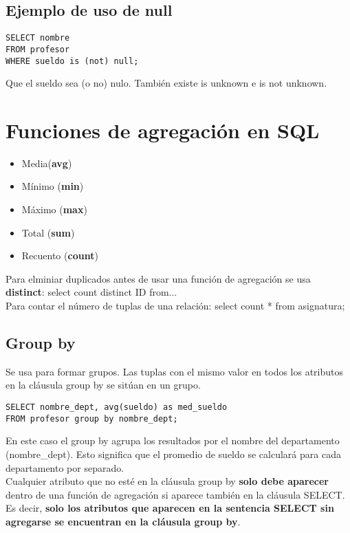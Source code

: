 \documentclass{article}
\begin{document}
\subsection{Ejemplo de uso de null}
\begin{verbatim}
SELECT nombre 
FROM profesor
WHERE sueldo is (not) null;
\end{verbatim}
Que el sueldo sea (o no) nulo. También existe is unknown e is not unknown.

\section{Funciones de agregación en SQL}
\begin{itemize}
    \item Media(\textbf{avg})
    \item Mínimo (\textbf{min})
    \item Máximo (\textbf{max})
    \item Total (\textbf{sum})
    \item Recuento (\textbf{count})
\end{itemize}
Para elminiar duplicados antes de usar una función de agregación se usa \textbf{distinct}: select count distinct ID from... \\

Para contar el número de tuplas de una relación: select count * from asignatura; \\

\subsection{Group by}
Se usa para formar grupos. Las tuplas con el mismo valor en todos los atributos en la cláusula group by se sitúan en un grupo. 
\begin{verbatim}
SELECT nombre_dept, avg(sueldo) as med_sueldo
FROM profesor group by nombre_dept;
\end{verbatim}
En este caso el group by agrupa los resultados por el nombre del departamento (nombre\_dept). Esto significa que el promedio de sueldo se calculará para cada departamento por separado. \\

Cualquier atributo que no esté en la cláusula group by \textbf{solo debe aparecer} dentro de una función de agregación si aparece también en la cláusula SELECT. Es decir, \textbf{solo los atributos que aparecen en la sentencia SELECT sin agregarse se encuentran en la cláusula group by}.
\end{document}
